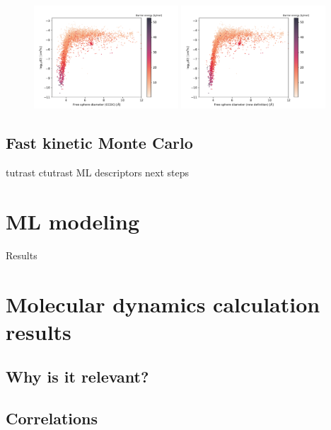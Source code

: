 \documentclass[main]{subfiles}
\begin{document}
\begin{figure}[ht]
    \centering
        \includegraphics[width=0.48\textwidth]{figures/5-diffusion/difflog_Df-ccdc_barrier.pdf}
        \includegraphics[width=0.48\textwidth]{figures/5-diffusion/difflog_Df-uff298K_barrier.pdf}
        \caption{}
        \label{fgr:}
\end{figure}

\subsection{Fast kinetic Monte Carlo}
tutrast
ctutrast\cite{Mace_2019}
ML descriptors
next steps

\section{ML modeling}

Results

\section{Molecular dynamics calculation results}

\subsection{Why is it relevant?}

\subsection{Correlations}
\end{document}
